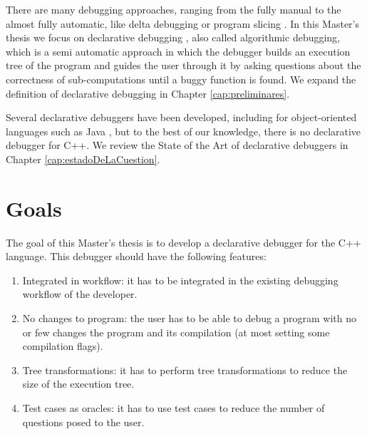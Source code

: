 
There are many debugging approaches, ranging from the fully manual to the almost fully automatic, like delta debugging or program slicing \cite{WhyProgramsFail}. In this Master's thesis we focus on declarative debugging \cite{shapiro1982algorithmic}, also called algorithmic debugging, which is a semi automatic approach in which the debugger builds an execution tree of the program and guides the user through it by asking questions about the correctness of sub-computations until a buggy function is found. We expand the definition of declarative debugging in Chapter \ref{cap:preliminares}.

Several declarative debuggers have been developed, including for object-oriented languages such as Java \cite{DDJ}, but to the best of our knowledge, there is no declarative debugger for C++. We review the State of the Art of declarative debuggers in Chapter \ref{cap:estadoDeLaCuestion}.

\section{Goals}
The goal of this Master's thesis is to develop a declarative debugger for the C++ language.
This debugger should have the following features:
\begin{enumerate}
  \item Integrated in workflow: it has to be integrated in the existing debugging workflow of the developer. \label{goal1}
  \item No changes to program: the user has to be able to debug a program with no or few changes the program and its compilation (at most setting some compilation flags). \label{goal2}
  \item Tree transformations: it has to perform tree transformations to reduce the size of the execution tree. \label{goal3}
  \item Test cases as oracles: it has to use test cases to reduce the number of questions posed to the user. \label{goal4}
\end{enumerate}

